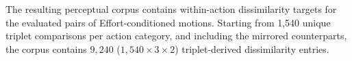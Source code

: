 \documentclass[letterpaper]{article} %
\begin{document}
The resulting perceptual corpus contains within-action dissimilarity targets for the evaluated pairs of Effort-conditioned motions. Starting from 1,540 unique triplet comparisons per action category, and including the mirrored counterparts, the corpus contains $9{,}240$ ($1{,}540 \times 3 \times 2$) triplet-derived dissimilarity entries.














\end{document}

